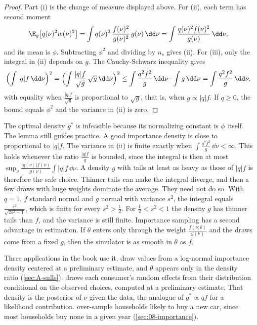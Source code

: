 \begin{proof}
Part (i) is the change of measure displayed above. For (ii), each term has second moment
\begin{equation*}
  \E_g\bigl[q(\nu)^2w(\nu)^2\bigr] = \int q(\nu)^2\,\frac{f(\nu)^2}{g(\nu)^2}\,g(\nu)\,\dd\nu
  = \int\frac{q(\nu)^2f(\nu)^2}{g(\nu)}\,\dd\nu,
\end{equation*}
and its mean is $\phi$. Subtracting $\phi^2$ and dividing by $n_s$ gives (ii). For (iii), only the integral in (ii)
depends on $g$. The Cauchy-Schwarz inequality gives
\begin{equation*}
  \Bigl(\int|q|f\,\dd\nu\Bigr)^2 = \Bigl(\int\frac{|q|f}{\sqrt g}\,\sqrt g\,\dd\nu\Bigr)^2
  \le \int\frac{q^2f^2}{g}\,\dd\nu\cdot\int g\,\dd\nu = \int\frac{q^2f^2}{g}\,\dd\nu,
\end{equation*}
with equality when $\frac{|q|f}{\sqrt g}$ is proportional to $\sqrt g$, that is, when $g \propto |q|f$. If $q \ge 0$,
the bound equals $\phi^2$ and the variance in (ii) is zero.
\end{proof}

The optimal density $g^*$ is infeasible because its normalizing constant is $\phi$ itself. The lemma still guides
practice. A good importance density is close to proportional to $|q|f$. The variance in (ii) is finite exactly when
$\int\frac{q^2f^2}{g}\,\dd\nu < \infty$. This holds whenever the ratio $\frac{|q|f}{g}$ is bounded, since the integral
is then at most $\sup_\nu\frac{|q(\nu)|f(\nu)}{g(\nu)}\int|q|f\,\dd\nu$. A density $g$ with tails at least as heavy as
those of $|q|f$ is therefore the safe choice. Thinner tails can make the integral diverge, and then a few draws with
huge weights dominate the average. They need not do so. With $q = 1$, $f$ standard normal and $g$ normal with
variance $s^2$, the integral equals $\frac{s^2}{\sqrt{2s^2 - 1}}$, which is finite for every $s^2 > \frac{1}{2}$.
For $\frac{1}{2} < s^2 < 1$ the density $g$ has thinner tails than $f$, and the variance is still finite.
Importance sampling has a second advantage in estimation. If $\theta$ enters only through the weight
$\frac{f(\nu;\theta)}{g(\nu)}$ and the draws come from a fixed $g$, then the simulator is as smooth in $\theta$ as $f$.

Three applications in the book use it. \citet[pp.~960--961, 969]{LaffontOssardVuong1995} draw values from a
log-normal importance density centered at a preliminary estimate, and $\theta$ appears only in the density ratio
(\cref{sec:A-snlls}). \citet[p.~732, n.~31]{Gentzkow2007} draws each consumer's random effects from their
distribution conditional on the observed choices, computed at a preliminary estimate. That density is the posterior
of $\nu$ given the data, the analogue of $g^* \propto qf$ for a likelihood contribution. \citet[Section~6.3]{BerryLevinsohnPakes1995}
over-sample households likely to buy a new car, since most households buy none in a given year
(\cref{sec:08-importance}).

